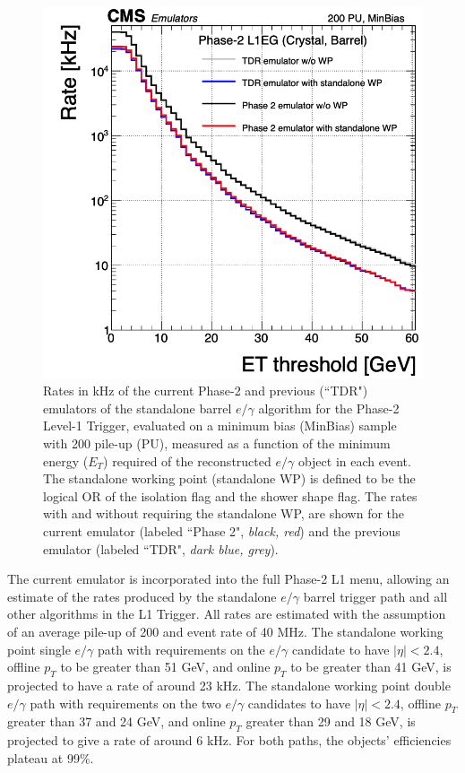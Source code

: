 \begin{figure}[h]
    \centering
    \includegraphics[width=12cm]{figures/ch-3-phase2/results-egamma-rates.png}
    \caption{Rates in kHz of the current Phase-2 and previous (``TDR") emulators of the standalone barrel $e/\gamma$ algorithm for the Phase-2 Level-1 Trigger, evaluated on a minimum bias (MinBias) sample with 200 pile-up (PU), measured as a function of the minimum energy ($E_T$) required of the reconstructed $e/\gamma$ object in each event. The standalone working point (standalone WP) is defined to be the logical OR of the isolation flag and the shower shape flag. The rates with and without requiring the standalone WP, are shown for the current emulator (labeled ``Phase 2", \textit{black, red}) and the previous emulator (labeled ``TDR", \textit{dark blue, grey}).}
    \label{fig:results-egamma-rates}
\end{figure}

The current emulator is incorporated into the full Phase-2 L1 menu, allowing an estimate of the rates produced by the standalone $e/\gamma$ barrel trigger path and all other algorithms in the L1 Trigger. All rates are estimated with the assumption of an average pile-up of 200 and event rate of 40 MHz. The standalone working point single $e/\gamma$ path with requirements on the $e/\gamma$ candidate to have $|\eta| < 2.4$, offline $p_{T}$ to be greater than 51 GeV, and online $p_{T}$ to be greater than 41 GeV, is projected to have a rate of around 23 kHz. The standalone working point double $e/\gamma$ path with requirements on the two $e/\gamma$ candidates to have $|\eta| < 2.4$, offline $p_{T}$ greater than 37 and 24 GeV, and online $p_{T}$ greater than 29 and 18 GeV, is projected to give a rate of around 6 kHz. For both paths, the objects' efficiencies plateau at 99\%. 
